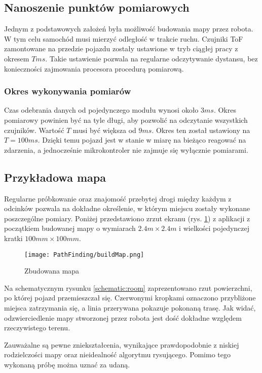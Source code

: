     \subsection{Nanoszenie punktów pomiarowych}
        Jednym z podstawowych założeń była możliwość budowania mapy przez robota.
        W tym celu samochód musi mierzyć odległość w trakcie ruchu.
        Czujniki ToF zamontowane na przedzie pojazdu zostały ustawione w tryb ciągłej pracy z okresem $T ms$.
        Takie ustawienie pozwala na regularne odczytywanie dystansu, bez konieczności zajmowania procesora procedurą pomiarową.

        \subsubsection{Okres wykonywania pomiarów}
            Czas odebrania danych od pojedynczego modułu wynosi około $3ms$.
            Okres pomiarowy powinien być na tyle długi, aby pozwolić na odczytanie wszystkich czujników.
            Wartość $T$ musi być większa od $9ms$.
            Okres ten został ustawiony na $T = 100ms$.
            Dzięki temu pojazd jest w stanie w miarę na bieżąco reagować na zdarzenia, a jednocześnie mikrokontroler nie zajmuje się wyłącznie pomiarami.

        \subsection{Przykładowa mapa}
            Regularne próbkowanie oraz znajomość przebytej drogi między każdym z odcinków pozwala na dokładne określenie, w którym miejscu zostały wykonane poszczególne pomiary.
            Poniżej przedstawiono zrzut ekranu (rys. \ref{fig:buildMap}) z aplikacji z początkiem budowanej mapy o wymiarach $ 2.4m \times 2.4m$ i wielkości pojedynczej kratki $100mm \times 100mm$.

            \begin{figure}[!ht]
                \centering
                \texttt{[image: PathFinding/buildMap.png]}
                \caption{Zbudowana mapa}
                \label{fig:buildMap}
            \end{figure}

            

            Na schematycznym rysunku \ref{schematic:room} zaprezentowano rzut powierzchni, po której pojazd przemieszczał się.
            Czerwonymi kropkami oznaczono przybliżone miejsca zatrzymania się, a linia przerywana pokazuje pokonaną trasę.
            Jak widać, odzwierciedlenie mapy stworzonej przez robota jest dość dokładne względem rzeczywistego terenu.

            Zauważalne są pewne zniekształcenia, wynikające prawdopodobnie z niskiej rodzielczości mapy oraz nieidealność algorytmu rysującego.
            Pomimo tego wykonaną próbę można uznać za udaną.